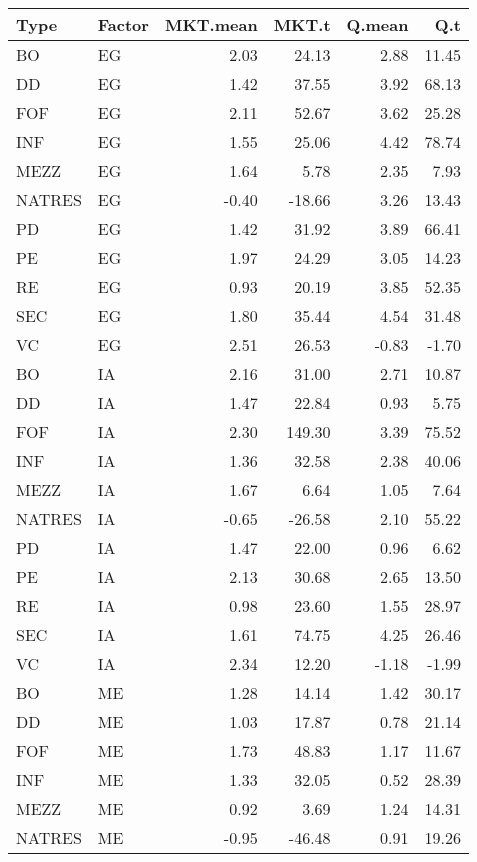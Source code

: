 \documentclass[12pt]{article}
\begin{document}
\begin{table}[ht]
	\centering
	\begin{tabular}{llrrrr}
		\hline
		Type & Factor & MKT.mean & MKT.t & Q.mean & Q.t \\ 
		\hline
		BO & EG & 2.03 & 24.13 & 2.88 & 11.45 \\ 
		DD & EG & 1.42 & 37.55 & 3.92 & 68.13 \\ 
		FOF & EG & 2.11 & 52.67 & 3.62 & 25.28 \\ 
		INF & EG & 1.55 & 25.06 & 4.42 & 78.74 \\ 
		MEZZ & EG & 1.64 & 5.78 & 2.35 & 7.93 \\ 
		NATRES & EG & -0.40 & -18.66 & 3.26 & 13.43 \\ 
		PD & EG & 1.42 & 31.92 & 3.89 & 66.41 \\ 
		PE & EG & 1.97 & 24.29 & 3.05 & 14.23 \\ 
		RE & EG & 0.93 & 20.19 & 3.85 & 52.35 \\ 
		SEC & EG & 1.80 & 35.44 & 4.54 & 31.48 \\ 
		VC & EG & 2.51 & 26.53 & -0.83 & -1.70 \\ 
		BO & IA & 2.16 & 31.00 & 2.71 & 10.87 \\ 
		DD & IA & 1.47 & 22.84 & 0.93 & 5.75 \\ 
		FOF & IA & 2.30 & 149.30 & 3.39 & 75.52 \\ 
		INF & IA & 1.36 & 32.58 & 2.38 & 40.06 \\ 
		MEZZ & IA & 1.67 & 6.64 & 1.05 & 7.64 \\ 
		NATRES & IA & -0.65 & -26.58 & 2.10 & 55.22 \\ 
		PD & IA & 1.47 & 22.00 & 0.96 & 6.62 \\ 
		PE & IA & 2.13 & 30.68 & 2.65 & 13.50 \\ 
		RE & IA & 0.98 & 23.60 & 1.55 & 28.97 \\ 
		SEC & IA & 1.61 & 74.75 & 4.25 & 26.46 \\ 
		VC & IA & 2.34 & 12.20 & -1.18 & -1.99 \\ 
		BO & ME & 1.28 & 14.14 & 1.42 & 30.17 \\ 
		DD & ME & 1.03 & 17.87 & 0.78 & 21.14 \\ 
		FOF & ME & 1.73 & 48.83 & 1.17 & 11.67 \\ 
		INF & ME & 1.33 & 32.05 & 0.52 & 28.39 \\ 
		MEZZ & ME & 0.92 & 3.69 & 1.24 & 14.31 \\ 
		NATRES & ME & -0.95 & -46.48 & 0.91 & 19.26 \\ 

\end{tabular}
\end{table}
\end{document}
